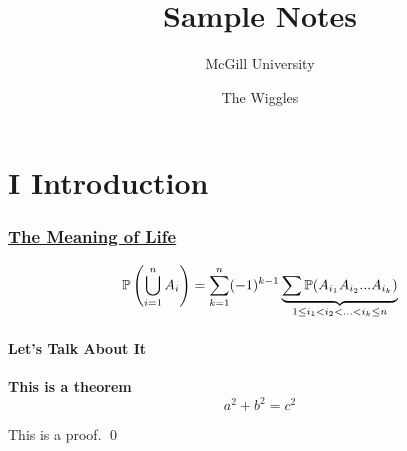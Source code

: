 \documentclass[toc]{lecturenew} %
\title{Sample Notes}
\subtitle{M\footnotesize c\normalsize Gill University}
\author{The Wiggles}
\newcommand{\say}[1]{\margintext{\runin{#1}}}
\newcommand{\theorem}[1]{\begin{mdframed}[style=theorem]
			#1
	\end{mdframed}}
\renewcommand{\proof}[2][]{\say{\vspace{.4cm}\\Proof#1.}\begin{mdframed}[style=proof]
			#2\qed
	\end{mdframed}}
\begin{document}
	\newpage
	\part{I \quad Introduction}
	\renewcommand\partcontent{Introduction}
	\setcounter{page}{3}
	\section{\underline{The Meaning of Life}}
	$$\P\left(\bigcup_{i=1}^nA_i\right) = \sum_{k=1}^{n} (-1)^{k-1}\underbrace{\sum\P(A_{i_1}A_{i_2} ...A_{i_k})}_{1 \leq i_1 < i_2 < ... < i_k \leq n}$$
	\subsection{Let's Talk About It}
	\theorem{
	\textbf{This is a theorem}
	$$a^2+b^2=c^2$$
		}
	\proof{
	This is a proof.
		}
	
	
	
\end{document}
